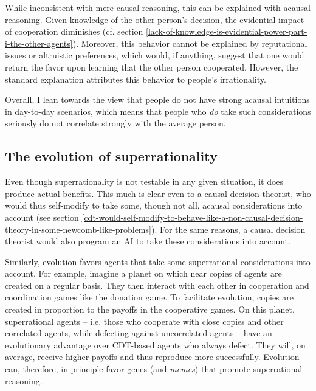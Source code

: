 While inconsistent with mere causal reasoning, this can be explained
with acausal reasoning. Given knowledge of the other person's decision,
the evidential impact of cooperation diminishes (cf. section
\ref{lack-of-knowledge-is-evidential-power-part-i-the-other-agents}).
Moreover, this behavior cannot be explained by reputational issues or
altruistic preferences, which would, if anything, suggest that one would
return the favor upon learning that the other person cooperated.
However, the standard explanation attributes this behavior to people's
irrationality.

Overall, I lean towards the view that people do not have strong acausal
intuitions in day-to-day scenarios, which means that people who
\emph{do} take such considerations seriously do not correlate strongly
with the average person.

\hypertarget{the-evolution-of-superrationality}{\subsection{The
evolution of superrationality}\label{the-evolution-of-superrationality}}

Even though superrationality is not testable in any given situation, it
does produce actual benefits. This much is clear even to a causal
decision theorist, who would thus self-modify to take some, though not
all, acausal considerations into account (see section
\ref{cdt-would-self-modify-to-behave-like-a-non-causal-decision-theory-in-some-newcomb-like-problems}). For the
same reasons, a causal decision theorist would also program an AI to
take these considerations into account.

Similarly, evolution favors agents that take some superrational
considerations into account. For example, imagine a planet on which near
copies of agents are created on a regular basis. They then interact with
each other in cooperation and coordination games like the donation game.
To facilitate evolution, copies are created in proportion to the payoffs
in the cooperative games. On this planet, superrational agents -- i.e.
those who cooperate with close copies and other correlated agents, while
defecting against uncorrelated agents -- have an evolutionary advantage
over CDT-based agents who always defect. They will, on average, receive
higher payoffs and thus reproduce more successfully. Evolution can,
therefore, in principle favor genes (and
\href{https://en.wikipedia.org/wiki/Meme}{\emph{memes}}) that
promote superrational reasoning.

